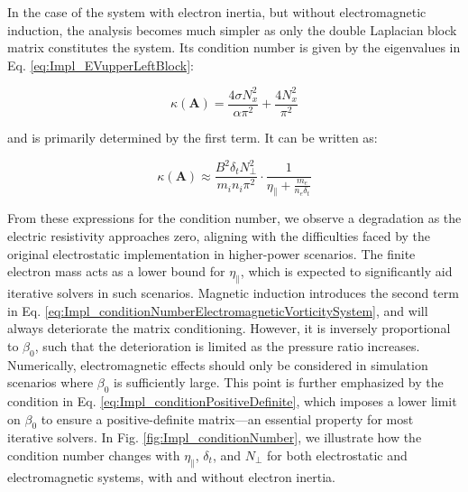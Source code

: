 In the case of the system with electron inertia, but without electromagnetic induction, the analysis becomes much simpler as only the double Laplacian block matrix constitutes the system. Its condition number is given by the eigenvalues in Eq. \ref{eq:Impl_EVupperLeftBlock}:

\begin{equation}
	\label{eq:Impl_conditionNumberM_electronInertia}
	\kappa(\textbf{A}) = \frac{4\sigma N_x^2}{\alpha\pi^2} + \frac{4 N_x^2}{\pi^2}
\end{equation}

and is primarily determined by the first term. It can be written as:

\begin{equation}
	\label{eq:Impl_conditionNumberElectrnInertiaVorticitySystem}
	\boxed{
		\kappa(\textbf{A}) \approx \frac{ B^2\delta_t N_\perp^2}{m_in_i\pi^2} \cdot \frac{1}{\eta_\parallel + \frac{m_e}{n_e \delta_t}}
	}
\end{equation}

From these expressions for the condition number, we observe a degradation as the electric resistivity approaches zero, aligning with the difficulties faced by the original electrostatic implementation in higher-power scenarios. The finite electron mass acts as a lower bound for $\eta_\parallel$, which is expected to significantly aid iterative solvers in such scenarios. Magnetic induction introduces the second term in Eq. \ref{eq:Impl_conditionNumberElectromagneticVorticitySystem}, and will always deteriorate the matrix conditioning. However, it is inversely proportional to $\beta_0$, such that the deterioration is limited as the pressure ratio increases. Numerically, electromagnetic effects should only be considered in simulation scenarios where $\beta_0$ is sufficiently large. This point is further emphasized by the condition in Eq. \ref{eq:Impl_conditionPositiveDefinite}, which imposes a lower limit on $\beta_0$ to ensure a positive-definite matrix—an essential property for most iterative solvers. In Fig. \ref{fig:Impl_conditionNumber}, we illustrate how the condition number changes with $\eta_\parallel$, $\delta_t$, and $N_\perp$ for both electrostatic and electromagnetic systems, with and without electron inertia. 

